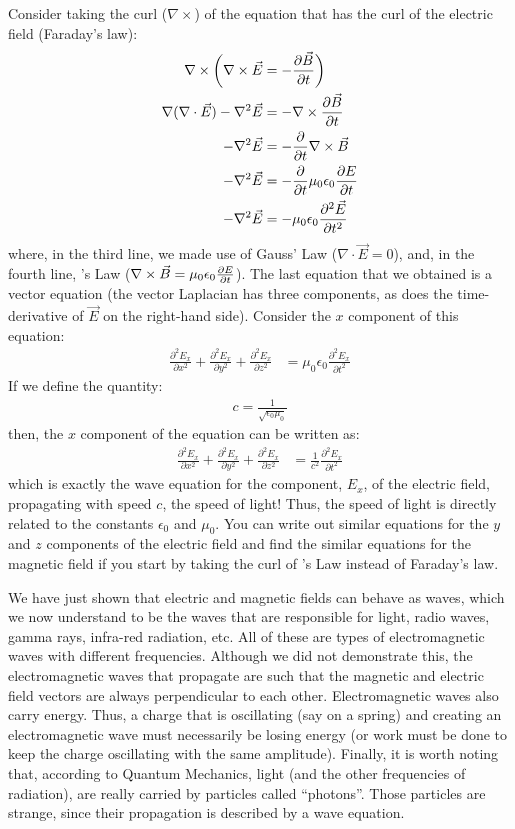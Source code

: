 Consider taking the curl ($\nabla \times$) of the equation that has the curl of the electric field (Faraday's law):
\begin{align*}
\nabla \times \bigg(\nabla \times \vec E &= -\frac{\partial \vec B}{\partial t}\bigg)\\
\nabla(\nabla\cdot \vec E)-\nabla^2\vec E &= -\nabla \times \frac{\partial \vec B}{\partial t}\\
-\nabla^2\vec E &= - \frac{\partial }{\partial t} \nabla \times \vec B\\
-\nabla^2\vec E &= - \frac{\partial }{\partial t} \mu_0 \epsilon_0\frac{\partial E}{\partial t}\\
-\nabla^2\vec E &= - \mu_0 \epsilon_0\frac{\partial^2\vec E}{\partial t^2} 
\end{align*}
where, in the third line, we made use of Gauss' Law ($\nabla \cdot \vec E=0$), and, in the fourth line, \ampere's Law ($\nabla \times \vec B = \mu_0 \epsilon_0\frac{\partial E}{\partial t}$). The last equation that we obtained is a vector equation (the vector Laplacian has three components, as does the time-derivative of $\vec E$ on the right-hand side). Consider the $x$ component of this equation:
\begin{align*}
\frac{\partial^2 E_x}{\partial x^2}+\frac{\partial^2  E_x}{\partial y^2} + \frac{\partial^2 E_x}{\partial z^2}  &= \mu_0 \epsilon_0\frac{\partial^2 E_x}{\partial t^2} 
\end{align*}
If we define the quantity:
\begin{align*}
c = \frac{1}{\sqrt{\epsilon_0\mu_0}}
\end{align*}
then, the $x$ component of the equation can be written as:
\begin{align*}
\frac{\partial^2 E_x}{\partial x^2}+\frac{\partial^2  E_x}{\partial y^2} + \frac{\partial^2 E_x}{\partial z^2} &= \frac{1}{c^2}\frac{\partial^2 E_x}{\partial t^2} 
\end{align*}
which is exactly the wave equation for the component, $E_x$, of the electric field, propagating with speed $c$, the speed of light! Thus, the speed of light is directly related to the constants $\epsilon_0$ and $\mu_0$. You can write out similar equations for the $y$ and $z$ components of the electric field and find the similar equations for the magnetic field if you start by taking the curl of \ampere's Law instead of Faraday's law. 

We have just shown that electric and magnetic fields can behave as waves, which we now understand to be the waves that are responsible for light, radio waves, gamma rays, infra-red radiation, etc. All of these are types of electromagnetic waves with different frequencies. Although we did not demonstrate this, the electromagnetic waves that propagate are such that the magnetic and electric field vectors are always perpendicular to each other. Electromagnetic waves also carry energy. Thus, a charge that is oscillating (say on a spring) and creating an electromagnetic wave must necessarily be losing energy (or work must be done to keep the charge oscillating with the same amplitude). Finally, it is worth noting that, according to Quantum Mechanics, light (and the other frequencies of radiation), are really carried by particles called ``photons''. Those particles are strange, since their propagation is described by a wave equation. 


